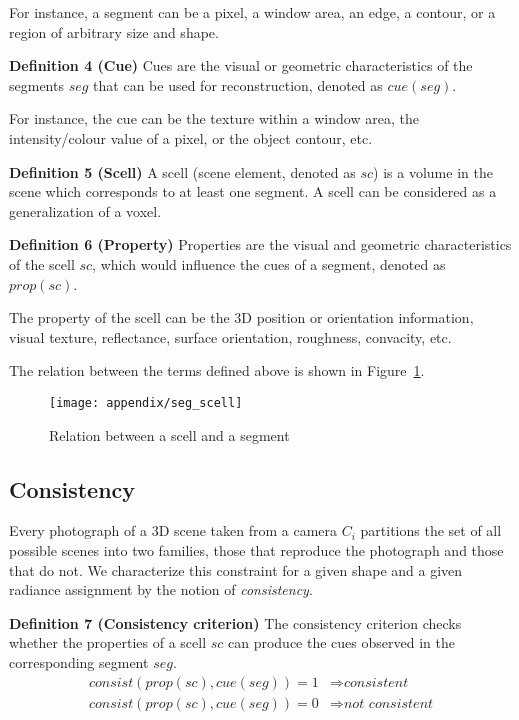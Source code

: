 For instance, a segment can be a pixel, a window area, an edge, a contour, or a region of arbitrary size and shape.

\noindent\textbf{Definition 4 (Cue)} Cues are the visual or geometric characteristics of the segments $seg$ that can be used for reconstruction, denoted as $cue(seg)$.

For instance, the cue can be the texture within a window area, the intensity/colour value of a pixel, or the object contour, etc.

\noindent\textbf{Definition 5 (Scell)} A scell (scene element, denoted as $sc$) is a volume in the scene which corresponds to at least one segment. A scell can be considered as a generalization of a voxel.

\noindent\textbf{Definition 6 (Property)} Properties are the visual and geometric characteristics of the scell $sc$, which would influence the cues of a segment, denoted as $prop(sc)$.

The property of the scell can be the 3D position or orientation information, visual texture, reflectance, surface orientation, roughness, convacity, etc.

The relation between the terms defined above is shown in Figure~\ref{fig:scell_seg}.
\begin{figure}[!htbp]
\centering
\texttt{[image: appendix/seg\_scell]}
\caption{Relation between a scell and a segment}
\label{fig:scell_seg}
\end{figure}


\subsection{Consistency}
Every photograph of a 3D scene taken from a camera $C_i$ partitions the set of all possible scenes into two families, those that reproduce the photograph and those that do not. We characterize this constraint for a given shape and a given radiance assignment by the notion of \textit{consistency}.

\noindent\textbf{Definition 7 (Consistency criterion)} The consistency criterion checks whether the properties of a scell $sc$ can produce the cues observed in the corresponding segment $seg$.
\begin{align*}
consist(prop(sc), cue(seg)) = 1 &\Rightarrow \textit{consistent}\\
consist(prop(sc), cue(seg)) = 0 &\Rightarrow \textit{not consistent}
\end{align*}

